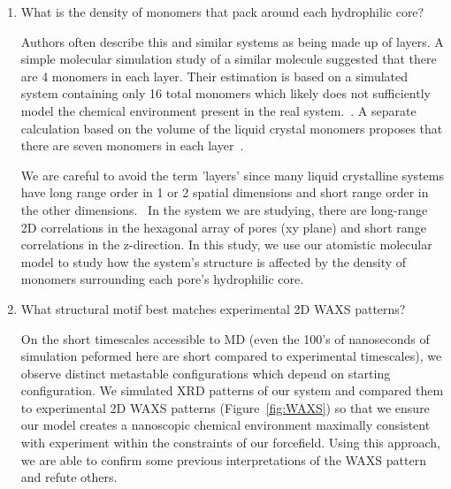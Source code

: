 \documentclass[journal=jpcbfk,manuscript=article]{achemso}
\begin{document}
  \begin{enumerate}
    \item What is the density of monomers that pack around each hydrophilic core? 
    \label{point:monomernum}

 	Authors often describe this and similar systems as being made up of layers. A simple
 	molecular simulation study of a similar molecule suggested that there are 4 monomers
 	in each layer. Their estimation is based on a simulated system containing only 16 total
 	monomers which likely does not sufficiently model the chemical environment present in
 	the real system.~\cite{zhu_methacrylated_2006}. A separate calculation based on the 
 	volume of the liquid crystal monomers proposes that there are seven monomers in each 
 	layer~\cite{resel_structural_2000}. 

 	We are careful to avoid the term 'layers' since many liquid crystalline systems
 	have long range order in 1 or 2 spatial dimensions and short range order in 	
 	the other dimensions.~\cite{chaikin_principles_1995}  %
 	In the system we are studying, there are long-range 2D correlations in the 
 	hexagonal array of pores (xy plane) and short range correlations in the z-direction.
    In this study, we use our atomistic molecular model to study how the system's structure is 
    affected by the density of monomers surrounding each pore's hydrophilic core. 

	\item What structural motif best matches experimental 2D WAXS patterns?\label{point:xrdmatch}

	On the short timescales accessible to MD (even the 100's of nanoseconds of simulation 
	peformed here are short compared to experimental timescales), we observe distinct metastable
	configurations which depend on starting configuration. We simulated XRD patterns of our system and 
	compared them to experimental 2D WAXS patterns (Figure~\ref{fig:WAXS}) so that we ensure our
	model creates a nanoscopic chemical environment maximally consistent with experiment within 
	the constraints	of our forcefield. Using this approach, we are able to confirm some previous
	interpretations	of the WAXS pattern and refute others. 
	

\end{enumerate}
\end{document}
